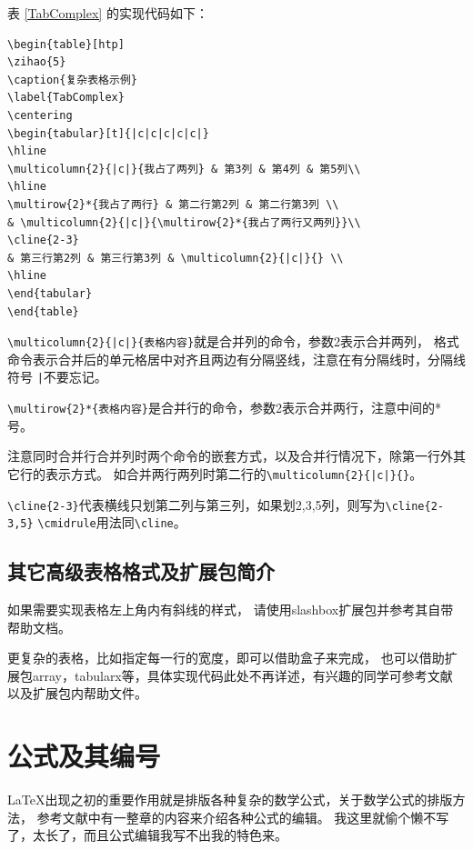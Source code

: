 表 \ref{TabComplex} 的实现代码如下：

{
\linespread{1}
\noindent
\begin{verbatim}
\begin{table}[htp]
\zihao{5}
\caption{复杂表格示例}
\label{TabComplex}
\centering
\begin{tabular}[t]{|c|c|c|c|c|}
\hline
\multicolumn{2}{|c|}{我占了两列} & 第3列 & 第4列 & 第5列\\
\hline
\multirow{2}*{我占了两行} & 第二行第2列 & 第二行第3列 \\
& \multicolumn{2}{|c|}{\multirow{2}*{我占了两行又两列}}\\
\cline{2-3}
& 第三行第2列 & 第三行第3列 & \multicolumn{2}{|c|}{} \\
\hline
\end{tabular}
\end{table}
\end{verbatim}
}

\verb+\multicolumn{2}{|c|}{表格内容}+就是合并列的命令，参数2表示合并两列，
格式命令表示合并后的单元格居中对齐且两边有分隔竖线，注意在有分隔线时，分隔线符号
\verb+|+不要忘记。

\verb+\multirow{2}*{表格内容}+是合并行的命令，参数2表示合并两行，注意中间的*号。

注意同时合并行合并列时两个命令的嵌套方式，以及合并行情况下，除第一行外其它行的表示方式。
如合并两行两列时第二行的\verb+\multicolumn{2}{|c|}{}+。

\verb+\cline{2-3}+代表横线只划第二列与第三列，如果划2,3,5列，则写为\verb+\cline{2-3,5}+
\verb+\cmidrule+用法同\verb+\cline+。

\subsection{其它高级表格格式及扩展包简介}

如果需要实现表格左上角内有斜线的样式，
请使用slashbox扩展包并参考其自带帮助文档。

更复杂的表格，比如指定每一行的宽度，即可以借助盒子\cite{LaTeXshzh}来完成，
也可以借助扩展包array，tabularx等，具体实现代码此处不再详述，有兴趣的同学可参考文献
\cite{LaTeXshzh, Table:Lapo}以及扩展包内帮助文件。

\section{公式及其编号}

\LaTeX 出现之初的重要作用就是排版各种复杂的数学公式，关于数学公式的排版方法，
参考文献\cite{LaTeXshzh}中有一整章的内容来介绍各种公式的编辑。
我这里就偷个懒不写了，太长了，而且公式编辑我写不出我的特色来。

